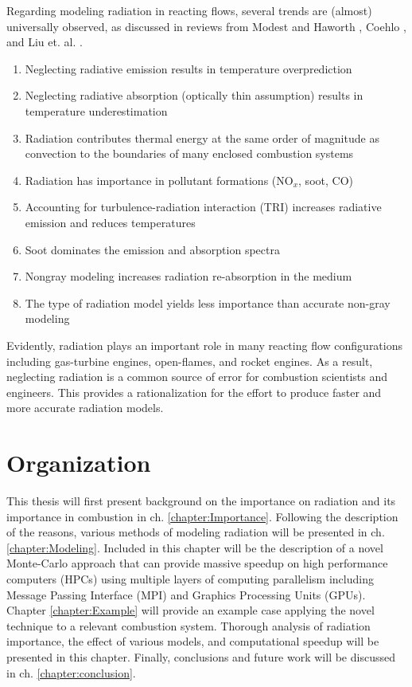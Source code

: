 Regarding modeling radiation in reacting flows, several trends are (almost) universally observed, as discussed in reviews from Modest and Haworth \cite{Modest2016RadiativeSystems}, Coehlo \cite{Coelho2018RadiativeSystems}, and Liu et. al. \cite{Liu2020TheFlames}.

\begin{enumerate}
    \item Neglecting radiative emission results in temperature overprediction \cite{Gamil2020AssessmentChamber}
    \item Neglecting radiative absorption (optically thin assumption) results in temperature underestimation
    \item Radiation contributes thermal energy at the same order of magnitude as convection to the boundaries of many enclosed combustion systems \cite{Gamil2020AssessmentChamber,Johnson2021AnalysisMethod}
    \item Radiation has importance in pollutant formations (NO${}_x$, soot, CO) \cite{Ihme2008ModelingFormulation,Habibi2007TurbulenceFlames}
    \item Accounting for turbulence-radiation interaction (TRI) increases radiative emission and reduces temperatures
    \item Soot dominates the emission and absorption spectra
    \item Nongray modeling increases radiation re-absorption in the medium\cite{Wu2021LimitationsFires}
    \item The type of radiation model yields less importance than accurate non-gray modeling
\end{enumerate}

Evidently, radiation plays an important role in many reacting flow configurations including gas-turbine engines, open-flames, and rocket engines.
As a result, neglecting radiation is a common source of error for combustion scientists and engineers. 
This provides a rationalization for the effort to produce faster and more accurate radiation models.


\section{Organization}
This thesis will first present background on the importance on radiation and its importance in combustion in ch. \ref{chapter:Importance}. 
Following the description of the reasons, various methods of modeling radiation will be presented in ch. \ref{chapter:Modeling}. Included in this chapter will be the description of a novel Monte-Carlo approach that can provide massive speedup on high performance computers (HPCs) using multiple layers of computing parallelism including Message Passing Interface (MPI) and Graphics Processing Units (GPUs).
Chapter \ref{chapter:Example} will provide an example case applying the novel technique to a relevant combustion system. Thorough analysis of radiation importance, the effect of various models, and computational speedup will be presented in this chapter.
Finally, conclusions and future work will be discussed in ch. \ref{chapter:conclusion}.